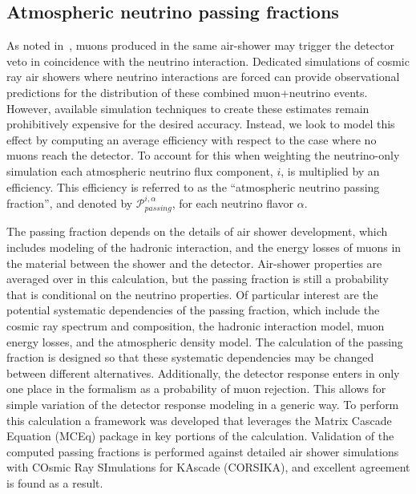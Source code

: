\subsection{Atmospheric neutrino passing fractions}
\label{sec:passingfractions}

As noted in~\cite{Schonert:2008is}, muons produced in the same air-shower may trigger the detector veto in coincidence with the neutrino interaction.
Dedicated simulations of cosmic ray air showers where neutrino interactions are forced can provide observational predictions for the distribution of these combined muon+neutrino events.
However, available simulation techniques to create these estimates remain prohibitively expensive for the desired accuracy.
Instead, we look to model this effect by computing an average efficiency with respect to the case where no muons reach the detector.
To account for this when weighting the neutrino-only simulation each atmospheric neutrino flux component, $i$, is multiplied by an efficiency.
This efficiency is referred to as the ``atmospheric neutrino passing fraction'', and denoted by $\mathcal{P}^{i,\alpha}_{passing}$, for each neutrino flavor $\alpha$.

The passing fraction depends on the details of air shower development, which includes modeling of the hadronic interaction, and the energy losses of muons in the material between the shower and the detector. 
Air-shower properties are averaged over in this calculation, but the passing fraction is still a probability that is conditional on the neutrino properties.
Of particular interest are the potential systematic dependencies of the passing fraction, which include the cosmic ray spectrum and composition, the hadronic interaction model, muon energy losses, and the atmospheric density model.
The calculation of the passing fraction is designed so that these systematic dependencies may be changed between different alternatives.
Additionally, the detector response enters in only one place in the formalism as a probability of muon rejection.
This allows for simple variation of the detector response modeling in a generic way.
To perform this calculation a framework was developed that leverages the Matrix Cascade Equation (MCEq) package in key portions of the calculation.
Validation of the computed passing fractions is performed against detailed air shower simulations with COsmic Ray SImulations for KAscade (CORSIKA), and excellent agreement is found as a result.

